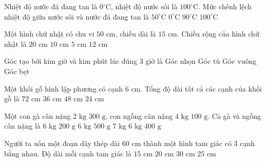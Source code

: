 \begin{ex} %
Nhiệt độ nước đá đang tan là $0^\circ\text{C}$, nhiệt độ nước sôi là $100^\circ\text{C}$. Mức chênh lệch nhiệt độ giữa nước sôi và nước đá đang tan là
\choice
{$50^\circ\text{C}$}
{$0^\circ\text{C}$}
{$90^\circ\text{C}$}
{\True $100^\circ\text{C}$}
\end{ex}

\begin{ex} %
Một hình chữ nhật có chu vi $50\text{ cm}$, chiều dài là $15\text{ cm}$. Chiều rộng của hình chữ nhật là
\choice
{$20\text{ cm}$}
{\True $10\text{ cm}$}
{$5\text{ cm}$}
{$12\text{ cm}$}
\end{ex}

\begin{ex} %
Góc tạo bởi kim giờ và kim phút lúc đúng 3 giờ là
\choice
{Góc nhọn}
{Góc tù}
{\True Góc vuông}
{Góc bẹt}
\end{ex}

\begin{ex} %
Một khối gỗ hình lập phương có cạnh $6\text{ cm}$. Tổng độ dài tất cả các cạnh của khối gỗ là
\choice
{\True $72\text{ cm}$}
{$36\text{ cm}$}
{$48\text{ cm}$}
{$24\text{ cm}$}
\end{ex}

\begin{ex} %
Một con gà cân nặng $2\text{ kg } 300\text{ g}$, con ngỗng cân nặng $4\text{ kg } 100\text{ g}$. Cả gà và ngỗng cân nặng là
\choice
{$6\text{ kg } 200\text{ g}$}
{$6\text{ kg } 500\text{ g}$}
{$7\text{ kg}$}
{\True $6\text{ kg } 400\text{ g}$}
\end{ex}

\begin{ex} %
Người ta uốn một đoạn dây thép dài $60\text{ cm}$ thành một hình tam giác có 3 cạnh bằng nhau. Độ dài mỗi cạnh tam giác là
\choice
{$15\text{ cm}$}
{\True $20\text{ cm}$}
{$30\text{ cm}$}
{$25\text{ cm}$}
\end{ex}

